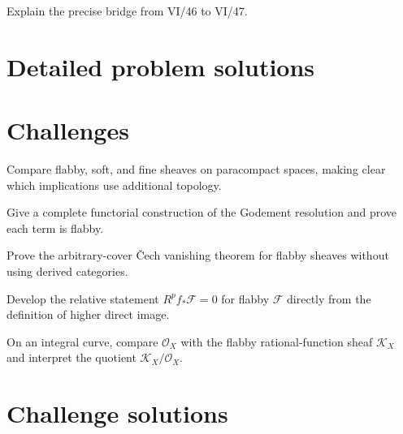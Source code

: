 \begin{problem}\label{prob:vi46-12}
Explain the precise bridge from VI/46 to VI/47.
\end{problem}

\ifdefined\FullProblemDossiers
\section{Detailed problem solutions}

\fi

\section{Challenges}
\begin{problem}[Challenge]\label{chal:vi46-01}
Compare flabby, soft, and fine sheaves on paracompact spaces, making clear which implications use additional topology.
\end{problem}

\begin{problem}[Challenge]\label{chal:vi46-02}
Give a complete functorial construction of the Godement resolution and prove each term is flabby.
\end{problem}

\begin{problem}[Challenge]\label{chal:vi46-03}
Prove the arbitrary-cover \v{C}ech vanishing theorem for flabby sheaves without using derived categories.
\end{problem}

\begin{problem}[Challenge]\label{chal:vi46-04}
Develop the relative statement $R^pf_*\mathcal F=0$ for flabby $\mathcal F$ directly from the definition of higher direct image.
\end{problem}

\begin{problem}[Challenge]\label{chal:vi46-05}
On an integral curve, compare $\mathcal O_X$ with the flabby rational-function sheaf $\mathcal K_X$ and interpret the quotient $\mathcal K_X/\mathcal O_X$.
\end{problem}

\ifdefined\IncludeChallengeSolutions
\section{Challenge solutions}

\fi

